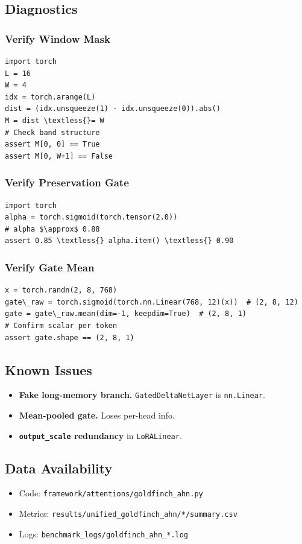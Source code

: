 \subsection{Diagnostics}

\subsubsection{Verify Window Mask}

\begin{lstlisting}
import torch
L = 16
W = 4
idx = torch.arange(L)
dist = (idx.unsqueeze(1) - idx.unsqueeze(0)).abs()
M = dist \textless{}= W
# Check band structure
assert M[0, 0] == True
assert M[0, W+1] == False
\end{lstlisting}

\subsubsection{Verify Preservation Gate}

\begin{lstlisting}
import torch
alpha = torch.sigmoid(torch.tensor(2.0))
# alpha $\approx$ 0.88
assert 0.85 \textless{} alpha.item() \textless{} 0.90
\end{lstlisting}

\subsubsection{Verify Gate Mean}

\begin{lstlisting}
x = torch.randn(2, 8, 768)
gate\_raw = torch.sigmoid(torch.nn.Linear(768, 12)(x))  # (2, 8, 12)
gate = gate\_raw.mean(dim=-1, keepdim=True)  # (2, 8, 1)
# Confirm scalar per token
assert gate.shape == (2, 8, 1)
\end{lstlisting}

\subsection{Known Issues}

\begin{itemize}
\item \textbf{Fake long-memory branch.} \texttt{GatedDeltaNetLayer} is \texttt{nn.Linear}.
\item \textbf{Mean-pooled gate.} Loses per-head info.
\item \textbf{\texttt{output\_scale} redundancy} in \texttt{LoRALinear}.

\end{itemize}
\subsection{Data Availability}

\begin{itemize}
\item Code: \texttt{framework/attentions/goldfinch\_ahn.py}
\item Metrics: \texttt{results/unified\_goldfinch\_ahn/*/summary.csv}
\item Logs: \texttt{benchmark\_logs/goldfinch\_ahn\_*.log}

\end{itemize}
